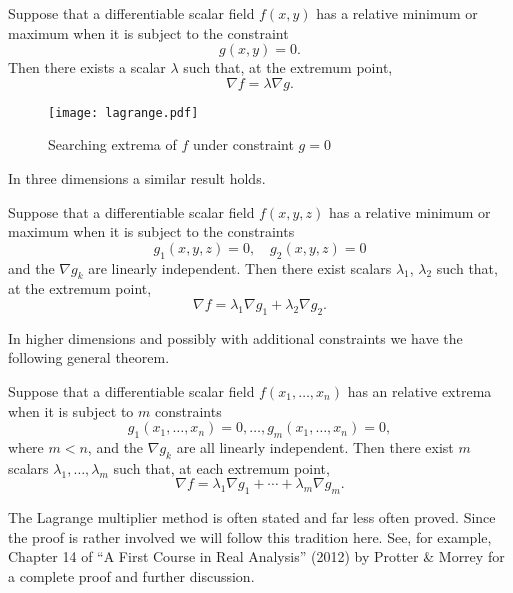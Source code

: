 \begin{theorem}
    Suppose that a differentiable scalar field \(f(x,y)\) has a relative minimum or maximum when it is subject to the constraint
    \[
        g(x,y) = 0.
    \]
    Then there exists a scalar \(\lambda\) such that, at the extremum point,
    \[
        \nabla f = \lambda \nabla g.
    \]
\end{theorem}

\begin{figure}[htb]
    \begin{center}
        \texttt{[image: lagrange.pdf]}
        \caption{Searching extrema of \(f\) under constraint \(g=0\)}%
        \label{fig:lagrange}
    \end{center}
\end{figure}

In three dimensions a similar result holds.

\begin{theorem}
    Suppose that a differentiable scalar field \(f(x,y,z)\) has a relative minimum or maximum when it is subject to the constraints
    \[
        g_{1}(x,y,z) = 0,
        \quad
        g_{2}(x,y,z) = 0
    \]
    and the \(\nabla g_k\) are linearly independent.
    Then there exist scalars \(\lambda_1\), \(\lambda_2\) such that, at the extremum point,
    \[
        \nabla f = \lambda_{1} \nabla g_{1} + \lambda_{2} \nabla g_{2}.
    \]
\end{theorem}

In higher dimensions and possibly with additional constraints we have the following general theorem.

\begin{theorem*}
    Suppose that a differentiable scalar field \(f(x_1,\ldots,x_n)\) has an relative extrema when it is subject to \(m\) constraints
    \[
        g_1(x_1,\ldots,x_n) = 0,
        \dots , g_m(x_1,\ldots,x_n)=0,
    \]
    where \(m<n\), and the \(\nabla g_k\) are all linearly independent.
    Then there exist \(m\) scalars \(\lambda_1,\ldots,\lambda_m\) such that, at each extremum point,
    \[
        \nabla f = \lambda_1 \nabla g_1 + \cdots + \lambda_m \nabla g_m.
    \]
\end{theorem*}

The Lagrange multiplier method is often stated and far less often proved.
Since the proof is rather involved we will follow this tradition here.
See, for example, Chapter 14 of  ``A First Course in Real Analysis''  (2012) by Protter \& Morrey for a complete proof and further discussion.

